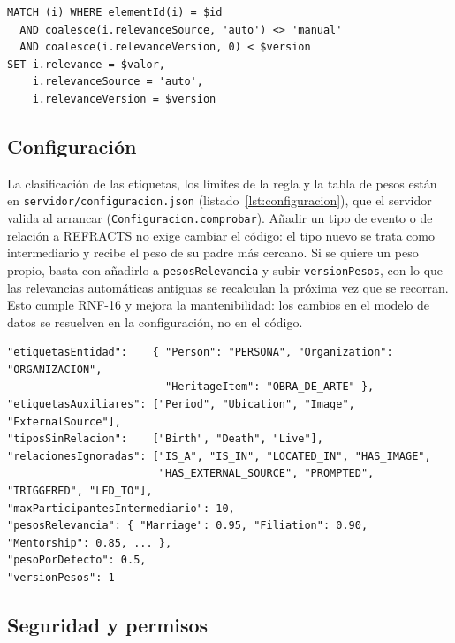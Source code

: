 \begin{lstlisting}[style=codigo, caption={Consulta prevista: guardar la relevancia sin pisar un valor manual.}, label={lst:cypher-guardar}]
MATCH (i) WHERE elementId(i) = $id
  AND coalesce(i.relevanceSource, 'auto') <> 'manual'
  AND coalesce(i.relevanceVersion, 0) < $version
SET i.relevance = $valor,
    i.relevanceSource = 'auto',
    i.relevanceVersion = $version
\end{lstlisting}

\subsection{Configuración}

La clasificación de las etiquetas, los límites de la regla y la tabla de pesos están en \texttt{servidor/configuracion.json} (listado~\ref{lst:configuracion}), que el servidor valida al arrancar (\texttt{Configuracion.comprobar}). Añadir un tipo de evento o de relación a REFRACTS no exige cambiar el código: el tipo nuevo se trata como intermediario y recibe el peso de su padre más cercano. Si se quiere un peso propio, basta con añadirlo a \texttt{pesosRelevancia} y subir \texttt{versionPesos}, con lo que las relevancias automáticas antiguas se recalculan la próxima vez que se recorran. Esto cumple RNF-16 y mejora la mantenibilidad: los cambios en el modelo de datos se resuelven en la configuración, no en el código.

\begin{lstlisting}[style=codigo, caption={Fragmento de \texttt{configuracion.json}.}, label={lst:configuracion}]
"etiquetasEntidad":    { "Person": "PERSONA", "Organization": "ORGANIZACION",
                         "HeritageItem": "OBRA_DE_ARTE" },
"etiquetasAuxiliares": ["Period", "Ubication", "Image", "ExternalSource"],
"tiposSinRelacion":    ["Birth", "Death", "Live"],
"relacionesIgnoradas": ["IS_A", "IS_IN", "LOCATED_IN", "HAS_IMAGE",
                        "HAS_EXTERNAL_SOURCE", "PROMPTED", "TRIGGERED", "LED_TO"],
"maxParticipantesIntermediario": 10,
"pesosRelevancia": { "Marriage": 0.95, "Filiation": 0.90, "Mentorship": 0.85, ... },
"pesoPorDefecto": 0.5,
"versionPesos": 1
\end{lstlisting}

\subsection{Seguridad y permisos}


